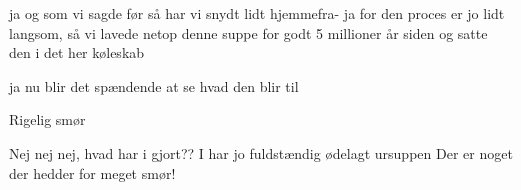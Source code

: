 \documentclass[a4paper,11pt]{article}
\begin{document}
\begin{sketch}
 ja og som vi sagde før så har vi snydt lidt hjemmefra- ja for den proces er jo lidt langsom, så vi lavede netop denne suppe for godt 5 millioner år siden og satte den i det her køleskab


 ja nu blir det spændende at se hvad den blir til


 Rigelig smør 

 Nej nej nej, hvad har i gjort?? I har jo fuldstændig ødelagt ursuppen  Der er noget der hedder for meget smør!


\end{sketch}
\end{document}
